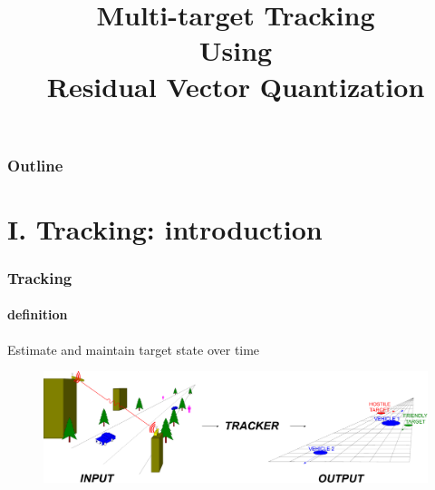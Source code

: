 
\title{Multi-target Tracking \\ Using \\Residual Vector Quantization}
\begin{frame}[plain]\logoCSIPCPL\logoTechTower
	\titlepage
\end{frame}

\begin{frame}
\frametitle{Outline}
\logoCSIPCPL\logoTechTower
	\setcounter{tocdepth}{2}	
	\tableofcontents
\end{frame}

\section{I. Tracking: introduction}
\begin{frame}
\frametitle{Tracking}
\framesubtitle{definition}
\logoCSIPCPL\mypagenum
	Estimate and maintain {\color{red}target state} over {\color{red}time}
	\begin{figure}
		\includegraphics[width=1.0\textwidth]{figs/TRK_overviewDiagram.pdf}
	\end{figure}
\end{frame}


